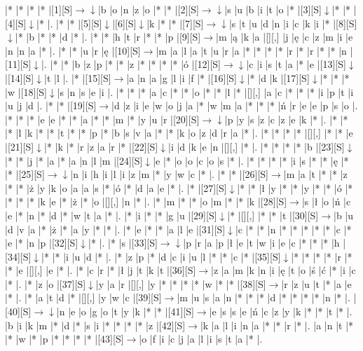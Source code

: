 \documentclass[11pt]{article}
\newcommand\drarr{$\rightarrow \!\!\!\!\! \downarrow$}
\newcommand\rarr{$\rightarrow$}
\newcommand\darr{$\downarrow$}
\begin{document}
\noindent\begin{Puzzle}{24}{33}|*	|*	|*	|*	|[1][S]\drarr	|b	|o	|n	|z	|o	|*	|*	|[2][S]\drarr	|s	|u	|b	|i	|t	|o	|*	|[3][S]\darr	|*	|*	|[4][S]\darr	|*	|.
|*	|*	|[5][S]\darr	|[6][S]\darr	|k	|*	|*	|[7][S]\drarr	|s	|t	|u	|d	|n	|i	|c	|k	|i	|*	|[8][S]\darr	|*	|b	|*	|*	|d	|*	|.
|*	|*	|h	|t	|r	|*	|*	|p	|[9][S]\rarr	|m	|ą	|k	|a	|[][,]{ }	|j	|ę	|c	|z	|m	|i	|e	|n	|n	|a	|*	|.
|*	|*	|u	|r	|ę	|[10][S]\rarr	|m	|a	|l	|a	|t	|u	|r	|a	|*	|*	|*	|*	|r	|*	|r	|*	|*	|n	|[11][S]\darr	|.
|*	|*	|b	|z	|p	|*	|*	|z	|*	|*	|*	|*	|ó	|[12][S]\drarr	|c	|i	|s	|t	|a	|*	|e	|[13][S]\darr	|[14][S]\darr	|t	|l	|.
|*	|[15][S]\rarr	|a	|n	|a	|g	|l	|i	|f	|*	|[16][S]\darr	|*	|d	|k	|[17][S]\darr	|*	|*	|*	|w	|[18][S]\darr	|s	|n	|s	|e	|i	|.
|*	|*	|*	|a	|c	|*	|*	|o	|*	|*	|l	|*	|[][,]{ }	|a	|c	|*	|*	|*	|i	|p	|t	|i	|u	|j	|d	|.
|*	|*	|[19][S]\rarr	|d	|z	|i	|e	|w	|o	|j	|a	|*	|w	|m	|a	|*	|*	|*	|ń	|r	|e	|e	|p	|s	|o	|.
|*	|*	|*	|e	|e	|*	|*	|a	|*	|*	|m	|*	|y	|u	|r	|[20][S]\drarr	|p	|y	|s	|z	|c	|z	|e	|k	|*	|.
|*	|*	|*	|l	|k	|*	|*	|t	|*	|*	|p	|*	|b	|s	|v	|a	|*	|*	|k	|o	|z	|d	|r	|a	|*	|.
|*	|*	|*	|*	|[][,]{ }	|*	|*	|e	|[21][S]\darr	|*	|k	|*	|r	|z	|a	|r	|*	|[22][S]\darr	|i	|d	|k	|e	|n	|[][,]{ }	|*	|.
|*	|*	|*	|*	|b	|[23][S]\darr	|*	|*	|j	|*	|a	|*	|a	|n	|l	|m	|[24][S]\darr	|e	|*	|o	|o	|c	|o	|s	|*	|.
|*	|*	|*	|*	|i	|s	|*	|*	|ę	|*	|*	|[25][S]\drarr	|n	|i	|h	|i	|l	|i	|z	|m	|*	|y	|w	|c	|*	|.
|*	|*	|[26][S]\rarr	|m	|a	|t	|*	|*	|z	|*	|*	|ż	|y	|k	|o	|a	|a	|s	|*	|ó	|*	|d	|a	|e	|*	|.
|*	|[27][S]\darr	|*	|*	|ł	|y	|*	|*	|y	|*	|*	|ó	|*	|*	|*	|*	|k	|e	|*	|ż	|*	|o	|[][,]{ }	|n	|*	|.
|*	|m	|*	|*	|o	|m	|*	|*	|k	|[28][S]\rarr	|s	|ł	|o	|ń	|c	|e	|*	|n	|*	|d	|*	|w	|t	|a	|*	|.
|*	|i	|*	|*	|g	|u	|[29][S]\darr	|*	|[][,]{ }	|*	|*	|t	|[30][S]\rarr	|b	|u	|d	|v	|a	|*	|ż	|*	|a	|y	|*	|*	|.
|*	|e	|*	|*	|a	|l	|e	|[31][S]\darr	|c	|*	|*	|n	|*	|*	|*	|*	|*	|c	|*	|e	|*	|n	|p	|[32][S]\darr	|*	|.
|*	|s	|[33][S]\drarr	|p	|r	|a	|p	|ł	|e	|t	|w	|i	|e	|c	|*	|*	|*	|h	|[34][S]\darr	|*	|*	|i	|u	|d	|*	|.
|*	|z	|p	|*	|d	|c	|i	|u	|l	|*	|*	|c	|*	|[35][S]\darr	|*	|*	|*	|*	|r	|*	|*	|e	|[][,]{ }	|e	|*	|.
|*	|c	|r	|*	|ł	|j	|t	|k	|t	|[36][S]\rarr	|z	|a	|m	|k	|n	|i	|ę	|t	|o	|ś	|ć	|*	|i	|c	|*	|.
|*	|z	|o	|[37][S]\darr	|y	|a	|r	|[][,]{ }	|y	|*	|*	|*	|*	|w	|*	|*	|[38][S]\rarr	|r	|z	|u	|t	|*	|a	|e	|*	|.
|*	|a	|t	|d	|*	|[][,]{ }	|y	|w	|c	|[39][S]\rarr	|m	|u	|s	|a	|n	|*	|*	|*	|d	|*	|*	|*	|*	|n	|*	|.
|[40][S]\drarr	|n	|e	|o	|g	|o	|t	|y	|k	|*	|*	|[41][S]\rarr	|e	|s	|s	|e	|ń	|c	|z	|y	|k	|*	|*	|t	|*	|.
|b	|i	|k	|m	|*	|d	|*	|s	|i	|*	|*	|*	|*	|z	|[42][S]\rarr	|k	|a	|l	|i	|n	|a	|*	|*	|r	|*	|.
|a	|n	|t	|*	|*	|w	|*	|p	|*	|*	|*	|*	|[43][S]\rarr	|o	|f	|i	|c	|j	|a	|l	|i	|s	|t	|a	|*	|.

\end{Puzzle}
\end{document}
